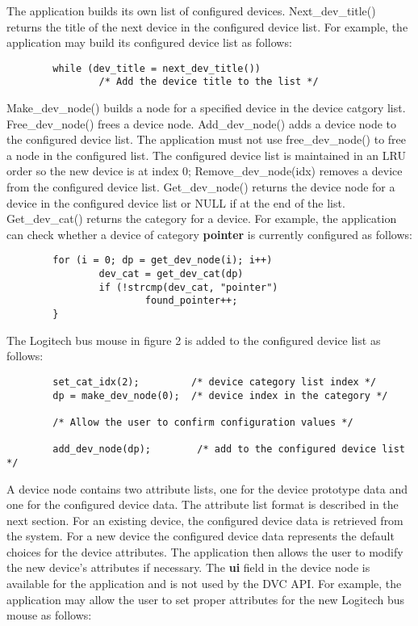 The application builds its own list of configured devices.
Next\_dev\_title() returns the title of the next device in the
configured device list. For example, the application may build its
configured device list as follows:

{\small \begin{verbatim}
        while (dev_title = next_dev_title())
                /* Add the device title to the list */
\end{verbatim}}

Make\_dev\_node() builds a node for a specified device in the device
catgory list.  Free\_dev\_node() frees a device node.  Add\_dev\_node()
adds a device node to the configured device list.  The application must
not use free\_dev\_node() to free a node in the configured list.  The
configured device list is maintained in an LRU order so the new device
is at index 0; Remove\_dev\_node(idx) removes a device from the
configured device list.  Get\_dev\_node() returns the device node for a
device in the configured device list or NULL if at  the end of the
list.  Get\_dev\_cat() returns the category for a device.  For example,
the application can check whether a device of category {\bf pointer} is
currently configured as follows:

{\small \begin{verbatim}
        for (i = 0; dp = get_dev_node(i); i++)
                dev_cat = get_dev_cat(dp)
                if (!strcmp(dev_cat, "pointer")
                        found_pointer++;
        }
\end{verbatim}}

The Logitech bus mouse in figure 2 is added to the configured device
list as follows:

{\small \begin{verbatim}
        set_cat_idx(2);         /* device category list index */
        dp = make_dev_node(0);  /* device index in the category */

        /* Allow the user to confirm configuration values */

        add_dev_node(dp);        /* add to the configured device list */
\end{verbatim}}

A device node contains two attribute lists, one for the device prototype
data and one for the configured device data.  The attribute list format is
described in the next section. For an existing device, the
configured device data is retrieved from the system. For a new device
the configured device data represents the default choices for the device
attributes.  The application then allows the user to modify the new
device's attributes if necessary.  The {\bf ui} field in the device
node is available for the application and is not used by the DVC API.
For example, the application may allow the user to set proper attributes
for the new Logitech bus mouse as follows:

